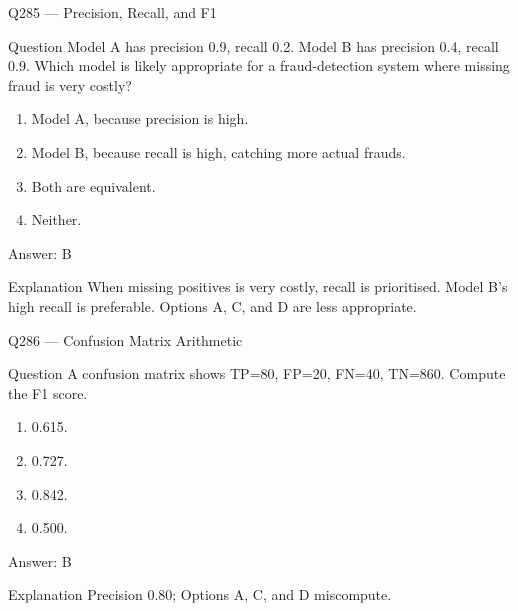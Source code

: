 \documentclass[aspectratio=169,8pt]{beamer}
\begin{document}
\begin{frame}{Q285 --- Precision, Recall, and F1}
\begin{block}{Question}
Model A has precision 0.9, recall 0.2. Model B has precision 0.4, recall 0.9. Which model is likely appropriate for a fraud-detection system where missing fraud is very costly?
\end{block}
\begin{enumerate}
\item Model A, because precision is high.
\item Model B, because recall is high, catching more actual frauds.
\item Both are equivalent.
\item Neither.
\end{enumerate}
\begin{exampleblock}{Answer: B}\end{exampleblock}
\begin{block}{Explanation}
When missing positives is very costly, recall is prioritised. Model B's high recall is preferable. Options A, C, and D are less appropriate.
\end{block}
\end{frame}

\begin{frame}{Q286 --- Confusion Matrix Arithmetic}
\begin{block}{Question}
A confusion matrix shows TP=80, FP=20, FN=40, TN=860. Compute the F1 score.
\end{block}
\begin{enumerate}
\item 0.615.
\item 0.727.
\item 0.842.
\item 0.500.
\end{enumerate} 
\begin{exampleblock}{Answer: B}\end{exampleblock}
\begin{block}{Explanation}
Precision  0.80; Options A, C, and D miscompute.
\end{block}
\end{frame}
\end{document}

